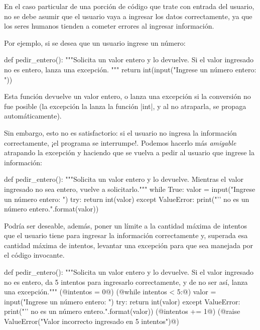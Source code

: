 En el caso particular de una porción de código que trate con entrada del
usuario, no se debe asumir que el usuario vaya a ingresar los datos
correctamente, ya que los seres humanos tienden a cometer errores al ingresar
información.

Por ejemplo, si se desea que un usuario ingrese un número:

\begin{codigo-python-sn}
def pedir_entero():
    """Solicita un valor entero y lo devuelve.
    Si el valor ingresado no es entero, lanza una excepción.
    """
    return int(input("Ingrese un número entero: "))
\end{codigo-python-sn}

Esta función devuelve un valor entero, o lanza una excepción si la conversión
no fue posible (la excepción la lanza la función |int|, y al no atraparla, se
propaga automáticamente).

Sin embargo, esto no es satisfactorio: si el usuario no ingresa la información
correctamente, ¡el programa se interrumpe!. Podemos hacerlo más {\it amigable}
atrapando la excepción y haciendo que se vuelva a pedir al usuario que ingrese
la información:

\begin{codigo-python-sn}
def pedir_entero():
    """Solicita un valor entero y lo devuelve.
    Mientras el valor ingresado no sea entero, vuelve a solicitarlo."""
    while True:
        valor = input("Ingrese un número entero: ")
        try:
            return int(valor)
        except ValueError:
            print("'{}' no es un número entero.".format(valor))
\end{codigo-python-sn}

Podría ser deseable, además, poner un límite a la cantidad máxima de intentos
que el usuario tiene para ingresar la información correctamente y, superada
esa cantidad máxima de intentos, levantar una excepción para que sea manejada
por el código invocante.

\begin{codigo-python-sn}
def pedir_entero():
    """Solicita un valor entero y lo devuelve.
    Si el valor ingresado no es entero, da 5 intentos para ingresarlo
    correctamente, y de no ser así, lanza una excepción."""
    (@intentos = 0@)
    (@while intentos < 5:@)
        valor = input("Ingrese un número entero: ")
        try:
            return int(valor)
        except ValueError:
            print("'{}' no es un número entero.".format(valor))
            (@intentos += 1@)
    (@raise ValueError("Valor incorrecto ingresado en 5 intentos")@)
\end{codigo-python-sn}

